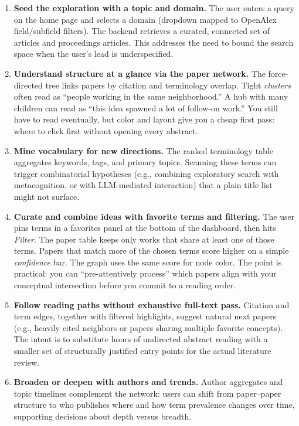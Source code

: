 \documentclass[sigconf]{acmart}
\begin{document}
\begin{enumerate}
  \item \textbf{Seed the exploration with a topic and domain.} The user enters a query on the home page and selects a domain (dropdown mapped to OpenAlex field/subfield filters). The backend retrieves a curated, connected set of articles and proceedings articles. This addresses the need to bound the search space when the user's lead is underspecified.

  \item \textbf{Understand structure at a glance via the paper network.} The force-directed tree links papers by citation and terminology overlap. Tight \emph{clusters} often read as ``people working in the same neighborhood.'' A hub with many children can read as ``this idea spawned a lot of follow-on work.'' You still have to read eventually, but color and layout give you a cheap first pass: where to click first without opening every abstract.

  \item \textbf{Mine vocabulary for new directions.} The ranked terminology table aggregates keywords, tags, and primary topics. Scanning these terms can trigger combinatorial hypotheses (e.g., combining exploratory search with metacognition, or with LLM-mediated interaction) that a plain title list might not surface.

  \item \textbf{Curate and combine ideas with favorite terms and filtering.} The user pins terms in a favorites panel at the bottom of the dashboard, then hits \emph{Filter}. The paper table keeps only works that share at least one of those terms. Papers that match more of the chosen terms score higher on a simple \emph{confidence} bar. The graph uses the same score for node color. The point is practical: you can ``pre-attentively process'' which papers align with your conceptual intersection before you commit to a reading order.

  \item \textbf{Follow reading paths without exhaustive full-text pass.} Citation and term edges, together with filtered highlights, suggest natural next papers (e.g., heavily cited neighbors or papers sharing multiple favorite concepts). The intent is to substitute hours of undirected abstract reading with a smaller set of structurally justified entry points for the actual literature review.

  \item \textbf{Broaden or deepen with authors and trends.} Author aggregates and topic timelines complement the network: users can shift from paper--paper structure to who publishes where and how term prevalence changes over time, supporting decisions about depth versus breadth.
\end{enumerate}
\end{document}
